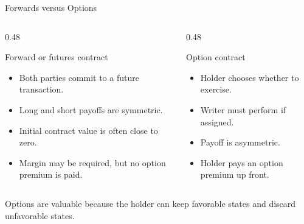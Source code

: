 \documentclass[aspectratio=169,11pt]{beamer}
\begin{document}
\begin{frame}{Forwards versus Options}
    \begin{columns}[T]
        \begin{column}{0.48\textwidth}
            \begin{block}{Forward or futures contract}
                \begin{itemize}
                    \item Both parties commit to a future transaction.
                    \item Long and short payoffs are symmetric.
                    \item Initial contract value is often close to zero.
                    \item Margin may be required, but no option premium is paid.
                \end{itemize}
            \end{block}
        \end{column}
        \begin{column}{0.48\textwidth}
            \begin{block}{Option contract}
                \begin{itemize}
                    \item Holder chooses whether to exercise.
                    \item Writer must perform if assigned.
                    \item Payoff is asymmetric.
                    \item Holder pays an option premium up front.
                \end{itemize}
            \end{block}
        \end{column}
    \end{columns}

    \vspace{0.5em}
    Options are valuable because the holder can keep favorable states and discard unfavorable states.
\end{frame}
\end{document}
